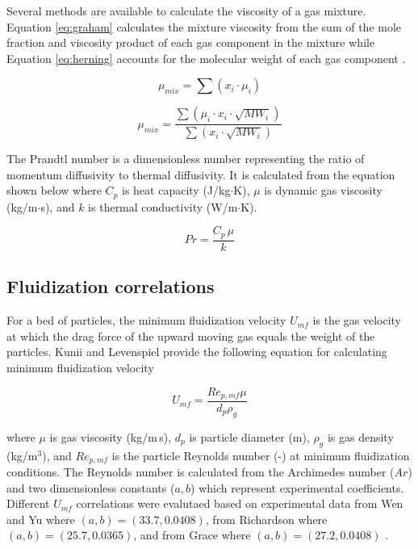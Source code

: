 Several methods are available to calculate the viscosity of a gas mixture. Equation \ref{eq:graham} calculates the mixture viscosity from the sum of the mole fraction and viscosity product of each gas component in the mixture \cite{Graham-1846} while Equation \ref{eq:herning} accounts for the molecular weight of each gas component \cite{Herning-1936}.

\begin{equation}\label{eq:graham}
    \mu_{mix} = \sum(x_i \cdot \mu_i)
\end{equation}

\begin{equation}\label{eq:herning}
    \mu_{mix} = \frac{\sum(\mu_i \cdot x_i \cdot \sqrt{MW_i})}{\sum(x_i \cdot \sqrt{MW_i})}
\end{equation}

The Prandtl number is a dimensionless number representing the ratio of momentum diffusivity to thermal diffusivity. It is calculated from the equation shown below where $C_p$ is heat capacity (J/kg$\cdot$K), $\mu$ is dynamic gas viscosity (kg/m$\cdot$s), and $k$ is thermal conductivity (W/m$\cdot$K).

\begin{equation}
    Pr = \frac{C_p\, \mu}{k}
\end{equation}


\subsection{Fluidization correlations}

For a bed of particles, the minimum fluidization velocity $U_{mf}$ is the gas velocity at which the drag force of the upward moving gas equals the weight of the particles. Kunii and Levenspiel \cite{Levenspiel-1991} provide the following equation for calculating minimum fluidization velocity

\begin{equation}
    U_{mf} = \frac{Re_{p,mf} \mu}{d_p \rho_g}
\end{equation}

\noindent where $\mu$ is gas viscosity (kg/m\,s), $d_p$ is particle diameter (m), $\rho_g$ is gas density (kg/m$^3$), and $Re_{p,mf}$ is the particle Reynolds number (-) at minimum fluidization conditions. The Reynolds number is calculated from the Archimedes number ($Ar$) and two dimensionless constants ($a, b$) which represent experimental coefficients. Different $U_{mf}$ correlations were evalutaed based on experimental data from Wen and Yu where $(a, b) = (33.7, 0.0408)$, from Richardson where $(a, b) = (25.7, 0.0365)$, and from Grace where $(a, b) = (27.2, 0.0408)$ \cite{Levenspiel-1991}.

